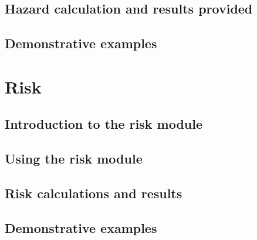 \documentclass[12pt,a4paper,headings=small,version=last,dvips]{scrbook}
\begin{document}
\chapter{Hazard calculation and results provided}
	\label{chap:hazout}
	
\chapter{Demonstrative examples}
	\label{chap:hazdemo}
	
\part{Risk}
\chapter{Introduction to the risk module}
	
\chapter{Using the risk module}
	\label{chap:riskmodule}
	
\chapter{Risk calculations and results}	
	\label{chap:riskout}
	
%
\chapter{Demonstrative examples}
	\label{chap:riskexamples}
	
%	
\end{document}
